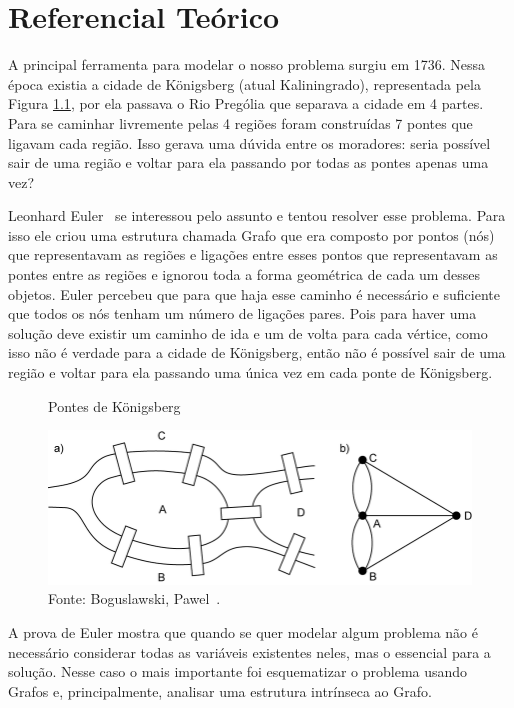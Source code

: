 \chapter{Referencial Teórico}

A principal ferramenta para modelar o nosso problema surgiu em 1736. Nessa época existia a cidade de Königsberg (atual Kaliningrado), representada pela Figura \ref{Konigsberg}, por ela passava o Rio Prególia que separava a cidade em 4 partes. Para se caminhar livremente pelas 4 regiões foram construídas 7 pontes que ligavam cada região. Isso gerava uma dúvida entre os moradores: seria possível sair de uma região e voltar para ela passando por todas as pontes apenas uma vez?

Leonhard Euler~\cite{Euler1736} se interessou pelo assunto e tentou resolver esse problema. Para isso ele criou uma estrutura chamada Grafo que era composto por pontos (nós) que representavam as regiões e 
ligações entre esses pontos  
que representavam as pontes entre as regiões 
e ignorou toda a forma geométrica de cada um desses objetos. Euler percebeu que para que haja esse caminho é necessário e suficiente que todos os nós tenham um número de ligações pares. Pois para haver uma solução deve existir um caminho de ida e um de volta para cada vértice, como isso não é verdade para a cidade de Königsberg, então 
não é possível sair de uma região e voltar para ela passando uma única vez em cada ponte de Königsberg.

\begin{figure}[H]
  \centering
  \captionsetup{font=normalsize,skip=1pt,singlelinecheck=on,labelsep=endash}
  \caption{Pontes de Königsberg}
  \includegraphics[scale=0.5]{figuras/Koenigsberg.png}
  \captionsetup{font=small,position=below,skip=-1pt}
   \caption*{Fonte: Boguslawski, Pawel~\cite{Koenigsberg}.}
   \label{Konigsberg}
\end{figure}

A prova de Euler mostra que quando se quer modelar algum problema não é necessário considerar todas as variáveis existentes neles, mas o essencial para a solução. Nesse caso o mais importante foi esquematizar o problema usando Grafos e, principalmente, analisar uma estrutura intrínseca ao Grafo.

